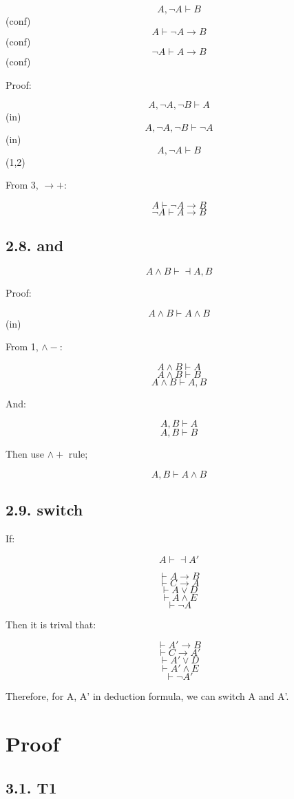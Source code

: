 \documentclass{article} %
\begin{document}
\[A, \neg A \vdash B\] (conf) \[A \vdash \neg A  \rightarrow B\] (conf)
\[\neg A \vdash A  \rightarrow B\] (conf)

Proof:

\[A, \neg A , \neg B\vdash A \] (in)
\[A, \neg A , \neg B\vdash \neg A \] (in) \[A, \neg A \vdash B\] (1,2)

From 3, \(\rightarrow+\):

\[A \vdash \neg A  \rightarrow B\] \[\neg A \vdash A  \rightarrow B\]

\hypertarget{and}{%
\subsection{2.8. and}\label{and}}

\[A\wedge B\vdash \dashv A,B\]

Proof:

\[A\wedge B \vdash A\wedge B\] (in)

From 1, \(\wedge-\):

\[A\wedge B \vdash A\] \[A\wedge B \vdash B\] \[A\wedge B \vdash A, B\]

And:

\[A, B\vdash A\] \[A, B\vdash B\]

Then use \(\wedge+\) rule;

\[A, B\vdash A\wedge B\]

\hypertarget{switch}{%
\subsection{2.9. switch}\label{switch}}

If:

\[A\vdash \dashv A'\]

\[\vdash A\rightarrow B\] \[\vdash C\rightarrow A\] \[\vdash A\vee D\]
\[\vdash A\wedge E\] \[\vdash \neg A\]

Then it is trival that:

\[\vdash A'\rightarrow B\] \[\vdash C\rightarrow A'\]
\[\vdash A'\vee D\] \[\vdash A'\wedge E\] \[\vdash \neg A'\]

Therefore, for A, A' in deduction formula, we can switch A and A'.

\hypertarget{proof}{%
\section{Proof}\label{proof}}

\hypertarget{t1}{%
\subsection{3.1. T1}\label{t1}}
\end{document}
